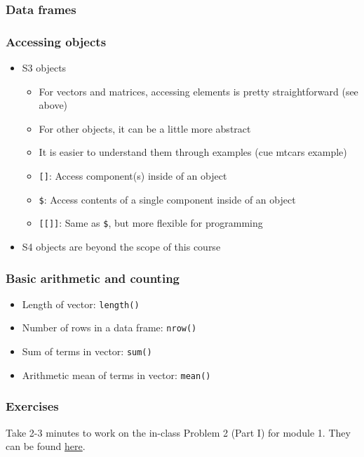 \documentclass{beamer}
\begin{document}
\begin{frame}[fragile]
    \frametitle{Data frames}
    
\end{frame}


\begin{frame}[fragile]
    \frametitle{Accessing objects}
	\begin{itemize}
	  \item S3 objects
      \pause
	    \begin{itemize}
	      \item For vectors and matrices, accessing elements is pretty straightforward (see above)
          \pause
	      \item For other objects, it can be a little more abstract
          \pause
	      \item It is easier to understand them through examples (cue mtcars example)
          \pause
	      \item \texttt{[]}: Access component(s) inside of an object
          \pause
	      \item \texttt{\$}: Access contents of a single component inside of an object
          \pause
	      \item \texttt{[[]]}: Same as \texttt{\$}, but more flexible for programming
	    \end{itemize}
      \pause
	  \item S4 objects are beyond the scope of this course
	\end{itemize}
\end{frame}


\begin{frame}
    \frametitle{Basic arithmetic and counting}
    \begin{itemize}
      \pause
      \item Length of vector: \texttt{length()}
      \pause
      \item Number of rows in a data frame: \texttt{nrow()}
      \pause
      \item Sum of terms in vector: \texttt{sum()}
      \pause
      \item Arithmetic mean of terms in vector: \texttt{mean()}
    \end{itemize}
\end{frame}


\begin{frame}
    \frametitle{Exercises}
    Take 2-3 minutes to work on the in-class Problem 2 (Part I) for module 1.
    They can be found \href{https://github.com/rnitulescu/RcourseOncology2021/blob/master/exercises1.R}{here}.
\end{frame}
\end{document}
